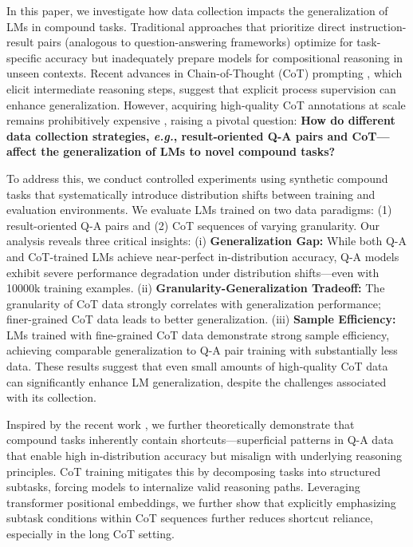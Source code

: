 In this paper, we investigate how data collection impacts the generalization of LMs in compound tasks. Traditional approaches that prioritize direct instruction-result pairs (analogous to question-answering frameworks) optimize for task-specific accuracy but inadequately prepare models for compositional reasoning in unseen contexts. Recent advances in Chain-of-Thought (CoT) prompting \cite{wei2022chain}, which elicit intermediate reasoning steps, suggest that explicit process supervision can enhance generalization. However, acquiring high-quality CoT annotations at scale remains prohibitively expensive \cite{lightman2023let,kim2023cot}, raising a pivotal question: \textbf{How do different data collection strategies, \emph{e.g.}, result-oriented Q-A pairs and CoT—affect the generalization of LMs to novel compound tasks?}

To address this, we conduct controlled experiments using synthetic compound tasks that systematically introduce distribution shifts between training and evaluation environments. We evaluate LMs trained on two data paradigms: (1) result-oriented Q-A pairs and (2) CoT sequences of varying granularity. Our analysis reveals three critical insights:  (i) \textbf{Generalization Gap:} While both Q-A and CoT-trained LMs achieve near-perfect in-distribution accuracy, Q-A models exhibit severe performance degradation under distribution shifts—even with 10000k training examples. (ii) \textbf{Granularity-Generalization Tradeoff:} The granularity of CoT data strongly correlates with generalization performance; finer-grained CoT data leads to better generalization. (iii) \textbf{Sample Efficiency:} LMs trained with fine-grained CoT data demonstrate strong sample efficiency, achieving comparable generalization to Q-A pair training with substantially less data. These results suggest that even small amounts of high-quality CoT data can significantly enhance LM generalization, despite the challenges associated with its collection.


Inspired by the recent work \cite{liu2022transformers}, we further theoretically demonstrate that compound tasks inherently contain shortcuts—superficial patterns in Q-A data that enable high in-distribution accuracy but misalign with underlying reasoning principles. CoT training mitigates this by decomposing tasks into structured subtasks, forcing models to internalize valid reasoning paths. Leveraging transformer positional embeddings, we further show that explicitly emphasizing subtask conditions within CoT sequences further reduces shortcut reliance, especially in the long CoT setting.

